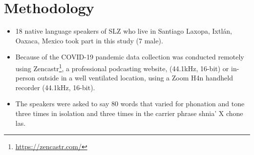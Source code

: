 \documentclass[12pt, letterpaper]{article}
\begin{document}
\section{Methodology} \label{sec:Methods}

\begin{itemize}
	\item 18 native language speakers of SLZ who live in Santiago Laxopa, Ixtlán, Oaxaca, Mexico took part in this study (7 male). 
	\item Because of the COVID-19 pandemic data collection was conducted remotely using Zencastr\footnote{\href{https://zencastr.com/}{https://zencastr.com/}}, a professional podcasting website, (44.1kHz, 16-bit) or in-person outside in a well ventilated location, using a Zoom H4n handheld recorder (44.1kHz, 16-bit).
	\item The speakers were asked to say 80 words that varied for phonation and tone three times in isolation and three times in the carrier phrase shnia' X chone las.
\end{itemize}


\printbibliography[heading=bibintoc]
\end{document}
